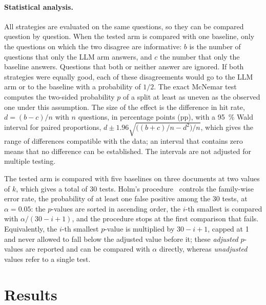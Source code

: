 \paragraph{Statistical analysis.} All strategies are evaluated on the same questions, so they
can be compared question by question. When the tested arm is compared with one baseline, only the questions on which
the two disagree are informative: $b$ is the number of questions that only the LLM arm
answers, and $c$ the number that only the baseline answers. Questions that both or neither
answer are ignored. If both strategies were equally good, each of these disagreements
would go to the LLM arm or to the baseline with a probability of $1/2$. The exact McNemar
test~\cite{mcnemar1947} computes the two-sided probability $p$ of a split at least as
uneven as the observed one under this assumption. The size of the effect is the
difference in hit rate, $d = (b-c)/n$ with $n$ questions, in percentage points (pp), with a
\SI{95}{\percent} Wald interval for paired proportions,
$d \pm 1.96\sqrt{\bigl((b+c)/n - d^2\bigr)/n}$, which gives the range of differences
compatible with the data; an interval that contains zero means that no difference can be
established. The intervals are not adjusted for multiple testing.

The tested arm is compared with five baselines on three documents at two values of $k$,
which gives a total of 30 tests. Holm's procedure~\cite{holm1979} controls the family-wise
error rate, the probability of at least one false positive among the 30 tests, at
$\alpha = 0.05$: the $p$-values are sorted in ascending order, the $i$-th smallest is
compared with $\alpha/(30-i+1)$, and the procedure stops at the first comparison that
fails. Equivalently, the $i$-th smallest $p$-value is multiplied by $30-i+1$, capped at 1
and never allowed to fall below the adjusted value before it; these \emph{adjusted}
$p$-values are reported and can be compared with $\alpha$ directly, whereas
\emph{unadjusted} values refer to a single test.

\section{Results}
\label{sec:results}

